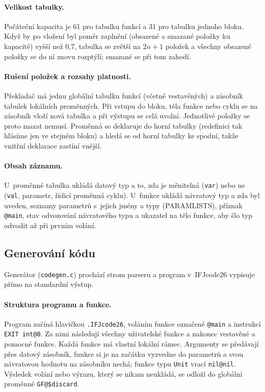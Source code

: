 \documentclass[11pt,a4paper]{article}
\begin{document}
\paragraph{Velikost tabulky.}
Počáteční kapacita je 61 pro tabulku funkcí a 31 pro tabulku jednoho
bloku. Když by po vložení byl poměr zaplnění (obsazené a smazané položky
ku kapacitě) vyšší než 0{,}7, tabulka se zvětší na $2n + 1$ položek
a všechny obsazené položky se do ní znovu rozptýlí; smazané se při tom
zahodí.

\paragraph{Rušení položek a rozsahy platnosti.}
Překladač má jednu globální tabulku funkcí (včetně vestavěných) a zásobník
tabulek lokálních proměnných. Při vstupu do bloku, těla funkce nebo cyklu
se na zásobník vloží nová tabulka a při výstupu se celá uvolní. Jednotlivé
položky se proto mazat nemusí. Proměnná se deklaruje do horní tabulky
(redefinici tak hlásíme jen ve stejném bloku) a hledá se od horní tabulky
ke spodní, takže vnitřní deklarace zastíní vnější.

\paragraph{Obsah záznamu.}
U~proměnné tabulka ukládá datový typ a to, zda je měnitelná
(\texttt{var}) nebo ne (\texttt{val}, parametr, řídicí proměnná cyklu).
U~funkce ukládá návratový typ a zda byl uveden, seznamy parametrů s~jejich
jmény a typy (PARAMLISTS), příznak \texttt{@main}, stav odvozování
návratového typu a ukazatel na tělo funkce, aby šlo typ odvodit až při
prvním volání.

\subsection{Generování kódu}
Generátor (\texttt{codegen.c}) prochází strom parseru a program
v~IFJcode26 vypisuje přímo na standardní výstup.

\paragraph{Struktura programu a funkce.}
Program začíná hlavičkou \texttt{.IFJcode26}, voláním funkce označené
\texttt{@main} a instrukcí \texttt{EXIT int@0}. Za nimi následují všechny
uživatelské funkce a nakonec vestavěné a pomocné funkce. Každá funkce má
vlastní lokální rámec. Argumenty se předávají přes datový zásobník,
funkce si je na začátku vyzvedne do parametrů a svou návratovou hodnotu
na zásobníku nechá; funkce typu \texttt{Unit} vrací \texttt{nil@nil}.
Výsledek volání nebo výrazu, který se nikam neukládá, se odloží do
globální proměnné \texttt{GF@\$discard}.
\end{document}
